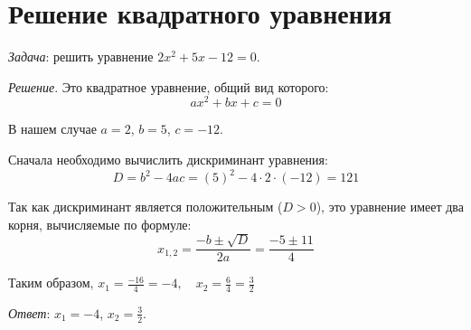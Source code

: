 \documentclass[a4paper,12pt]{article}
\begin{document}


\section*{Решение квадратного уравнения}

\emph{Задача}: решить уравнение $2x^2 + 5x - 12 = 0$.

\emph{Решение}. Это квадратное уравнение, общий вид которого:
\[ ax^2 + bx + c = 0 \]

В нашем случае $a = 2$, $b = 5$, $c = -12$.

Сначала необходимо вычислить дискриминант уравнения:
\[
D = b^2 - 4ac = (5)^2 - 4 \cdot 2 \cdot (-12) = 121
\]

Так как дискриминант является положительным ($D > 0$), это уравнение имеет два корня, вычисляемые по формуле:
\[
x_{1,2} = \frac{-b \pm \sqrt{D}}{2a} = \frac{-5 \pm 11}{4}
\]

Таким образом, $x_1 = \frac{-16}{4} = -4, \quad x_2 = \frac{6}{4} = \frac{3}{2}$

\emph{Ответ}: $x_1 = -4$, $x_2 = \frac{3}{2}$.
\end{document}
